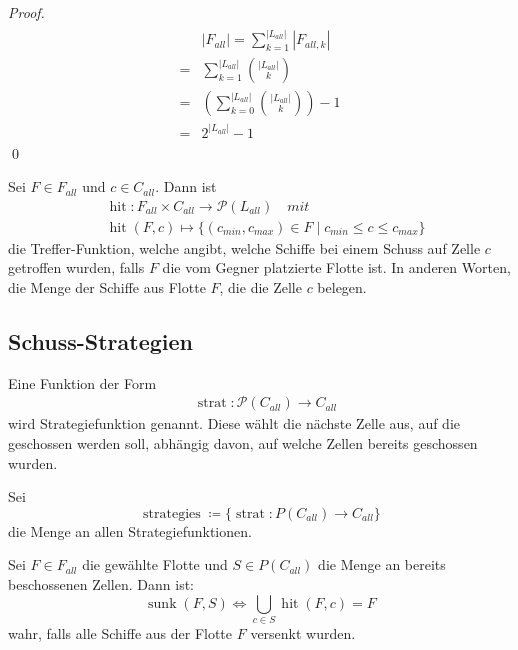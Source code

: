 \documentclass[a4paper,12pt]{llncs}
\numberwithin{equation}{section}
\DeclareMathOperator{\hit}{hit}
\DeclareMathOperator{\strat}{strat}
\DeclareMathOperator{\strategies}{strategies}
\DeclareMathOperator{\sunk}{sunk}
\begin{document}
\begin{proof}
\begin{align}
\begin{split}
&|F_{all}|=\sum_{k=1}^{|L_{all}|} |F_{all,k}|\\
=&\sum_{k=1}^{|L_{all}|} \binom{|L_{all}|}{k} \\
=&\left( \sum_{k=0}^{|L_{all}|} \binom{|L_{all}|}{k} \right) - 1 \\
=&2^{|L_{all}|} - 1
\end{split}
\end{align}
\qed
\end{proof}


\begin{definition}
Sei $F \in F_{all}$ und $c \in C_{all}$.
Dann ist 
\begin{align}
&\hit:F_{all} \times C_{all} \rightarrow \mathcal{P}(L_{all}) \quad mit \nonumber\\
&\hit(F, c)\mapsto \{(c_{min}, c_{max}) \in F \mid c_{min} \leq c \leq c_{max}\} \nonumber
\end{align}
die Treffer-Funktion, welche angibt, welche Schiffe bei einem Schuss auf Zelle $c$ getroffen wurden, falls $F$ die vom Gegner platzierte Flotte ist. In anderen Worten, die Menge der Schiffe aus Flotte $F$, die die Zelle $c$ belegen.
\end{definition}

\subsection{Schuss-Strategien}

\begin{definition}
Eine Funktion der Form
\begin{align}
&\strat:\mathcal{P}(C_{all}) \rightarrow C_{all} \nonumber
\end{align}
wird Strategiefunktion genannt. Diese wählt die nächste Zelle aus, auf die geschossen werden soll, abhängig davon, auf welche Zellen bereits geschossen wurden.
\end{definition}

\begin{definition}
Sei
\[
\strategies  \coloneqq \{ \strat:P(C_{all}) \rightarrow C_{all} \}
\]
die Menge an allen Strategiefunktionen.
\end{definition}

\begin{definition}
Sei $F\in F_{all}$ die gewählte Flotte und $S \in P(C_{all})$ die Menge an bereits beschossenen Zellen.
Dann ist:
\[
\sunk(F, S) \Leftrightarrow \bigcup_{c \in S} \hit(F, c) = F
\]
wahr, falls alle Schiffe aus der Flotte $F$ versenkt wurden.
\end{definition}
\end{document}
